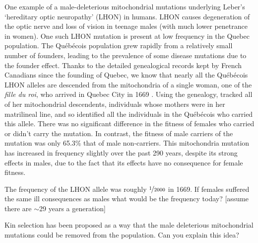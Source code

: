 {One example of a male-deleterious mitochondrial mutations underlying
Leber’s `hereditary optic neuropathy' (LHON) in humans. LHON causes degeneration
of the optic nerve and loss of vision in teenage males (with much
lower penetrance in women). One such LHON mutation is present at low
frequency in the Quebec population. The  Qu{\'e}b{\'e}cois population grew
rapidly from a relatively small number of founders, leading to the
prevalence of some disease mutations due to the founder effect. Thanks to the detailed
genealogical records kept by French Canadians since the founding of
Quebec, we know that nearly all the Qu{\'e}b{\'e}cois LHON alleles are
descended from the mitochondria of a single woman, one of the {\it fille du roi}, who arrived in Quebec City
in 1669 \citep{laberge2005fille}.  Using the genealogy, \citet{milot2017mother} tracked all
of her mitochondrial descendents, individuals whose mothers were in her
matrilineal line, and so identified all the individuals in the
Qu{\'e}b{\'e}cois who carried this allele.
There was no significant difference in the fitness of females who
carried or didn't carry the mutation. In contrast, the fitness of male carriers of the mutation was only 65.3\% that of male non-carriers. 
This mitochondria mutation has increased in frequency slightly over the past 290
years, despite its strong effects in males, due to the fact that its effects have no consequence for female fitness.

\begin{question}
The frequency of the LHON allele was roughly $\nicefrac{1}{2000}$ in
1669. If females suffered the same ill consequences as males what
would be the frequency today? [assume there are $\sim$29 years a generation]
\end{question}

\begin{question}
Kin selection has been proposed as a way that the male deleterious
mitochondrial mutations could be removed from the
population. Can you explain this idea?
\end{question}  

}
